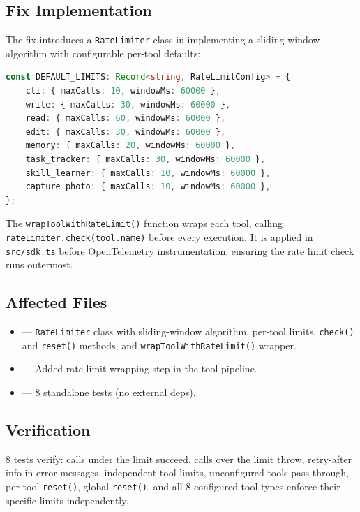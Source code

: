 \subsection*{Fix Implementation}
The fix introduces a \texttt{RateLimiter} class in  implementing a sliding-window algorithm with configurable per-tool defaults:

\begin{lstlisting}[language=TypeScript]
const DEFAULT_LIMITS: Record<string, RateLimitConfig> = {
    cli: { maxCalls: 10, windowMs: 60000 },
    write: { maxCalls: 30, windowMs: 60000 },
    read: { maxCalls: 60, windowMs: 60000 },
    edit: { maxCalls: 30, windowMs: 60000 },
    memory: { maxCalls: 20, windowMs: 60000 },
    task_tracker: { maxCalls: 30, windowMs: 60000 },
    skill_learner: { maxCalls: 10, windowMs: 60000 },
    capture_photo: { maxCalls: 10, windowMs: 60000 },
};
\end{lstlisting}

The \texttt{wrapToolWithRateLimit()} function wraps each tool, calling \texttt{rateLimiter.check(tool.name)} before every execution. It is applied in \texttt{src/sdk.ts} before OpenTelemetry instrumentation, ensuring the rate limit check runs outermost.

\subsection*{Affected Files}
\begin{itemize}
    \item {} --- \texttt{RateLimiter} class with sliding-window algorithm, per-tool limits, \texttt{check()} and \texttt{reset()} methods, and \texttt{wrapToolWithRateLimit()} wrapper.
    \item {} --- Added rate-limit wrapping step in the tool pipeline.
    \item {} --- 8 standalone tests (no external deps).
\end{itemize}

\subsection*{Verification}
8 tests verify: calls under the limit succeed, calls over the limit throw, retry-after info in error messages, independent tool limits, unconfigured tools pass through, per-tool \texttt{reset()}, global \texttt{reset()}, and all 8 configured tool types enforce their specific limits independently.
